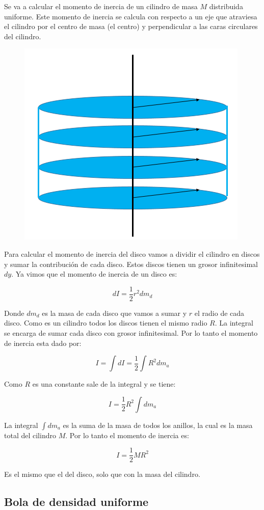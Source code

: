 \documentclass[a4paper,11pt]{article}
\theoremstyle{mytheor}
\begin{document}
Se va a calcular el momento de inercia de un cilindro de masa $M$ distribuida uniforme. Este momento de inercia se calcula con respecto a un eje que atraviesa el cilindro por el centro de masa (el centro) y perpendicular a las caras circulares del cilindro.

\begin{figure}[h]
	\includegraphics[width=0.5\linewidth]{cilindro2}
	\label{fcN4}
\end{figure}

Para calcular el momento de inercia del disco vamos a dividir el cilindro en discos y sumar la contribución de cada disco. Estos discos tienen un grosor infinitesimal $dy$. Ya vimos que el momento de inercia de un disco es:

$$ dI = \frac{1}{2} r^2 dm_d $$

Donde $dm_d$ es la masa de cada disco que vamos a sumar y $r$ el radio de cada disco. Como es un cilindro todos los discos tienen el mismo radio $R$. La integral se encarga de sumar cada disco con grosor infinitesimal. Por lo tanto el momento de inercia esta dado por:

$$ I = \int d I  = \frac{1}{2} \int R^2 dm_a $$

Como $R$ es una constante sale de la integral y se tiene:

$$ I = \frac{1}{2} R^2 \int dm_a$$

La integral $\int dm_a$ es la suma de la masa de todos los anillos, la cual es la masa total del cilindro $M$. Por lo tanto el momento de inercia es:

$$ I = \frac{1}{2} M R^2$$

Es el mismo que el del disco, solo que con la masa del cilindro. 

\subsection{Bola de densidad uniforme}
\end{document}
